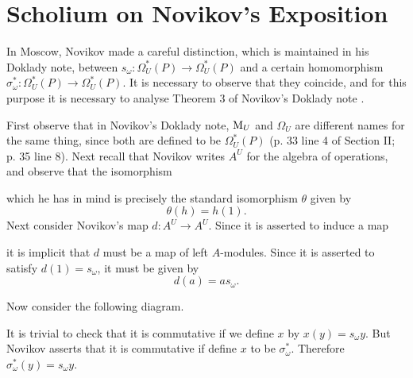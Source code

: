 \documentclass[../main]{subfiles}
\begin{document}

\chapter{Scholium on Novikov's Exposition}
\label{sec:p1c7}

In Moscow, Novikov made a careful distinction, which is maintained in his Doklady note, between $s_{\omega}\colon\Omega_U^{\ast}(P)\longrightarrow\Omega_U^{\ast}(P)$ and a certain homomorphism \newline $\sigma_{\omega}^{\ast}\colon\Omega_U^{\ast}(P)\longrightarrow\Omega_U^{\ast}(P)$. It is necessary to observe that they coincide, and for this purpose it is necessary to analyse Theorem 3 of Novikov's Doklady note \cite{novikov2}. %

First observe that in Novikov's Doklady note, $\mathrm{M}_U$ and $\Omega_U$ are different names for the same thing, since both are defined to be $\Omega_U^{\ast}(P)$ (p. 33 line 4 of Section II; p. 35 line 8). Next recall that Novikov writes $A^U$ for the algebra of operations, and observe that the isomorphism 
\begin{center}
\end{center}
which he has in mind is precisely the standard isomorphism $\theta$ given by
\begin{equation*}
    \theta(h)=h(1).
\end{equation*}
Next consider Novikov's map $d\colon A^U\longrightarrow A^U$. Since it is asserted to induce a map
\begin{center}
\end{center}
it is implicit that $d$ must be a map of left $A$-modules. Since it is asserted to satisfy $d(1)=s_{\omega}$, it must be given by
\begin{equation*}
    d(a)=as_{\omega}.
\end{equation*}

Now consider the following diagram.
\begin{center}
\end{center}

It is trivial to check that it is commutative if we define $x$ by $x(y)=s_{\omega}y$. But Novikov asserts that it is commutative if define $x$ to be $\sigma_{\omega}^{\ast}$. Therefore $\sigma_{\omega}^{\ast}(y)=s_{\omega}y$.
\end{document}
